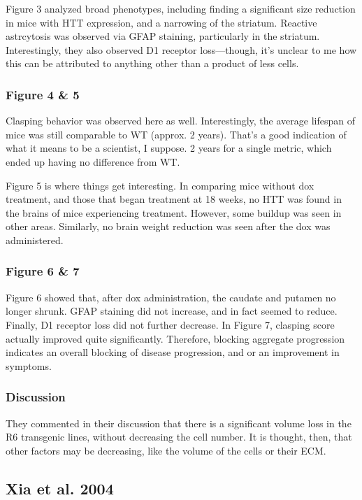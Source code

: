 Figure 3 analyzed broad phenotypes, including finding a significant size reduction in mice with HTT expression, and a narrowing of the striatum. Reactive astrcytosis was observed via GFAP staining, particularly in the striatum. Interestingly, they also observed D1 receptor loss---though, it's unclear to me how this can be attributed to anything other than a product of less cells. 

\subsubsection*{Figure 4 \& 5}

Clasping behavior was observed here as well. Interestingly, the average lifespan of mice was still comparable to WT (approx. 2 years). That's a good indication of what it means to be a scientist, I suppose. 2 years for a single metric, which ended up having no difference from WT.\newline

Figure 5 is where things get interesting. In comparing mice without dox treatment, and those that began treatment at 18 weeks, no HTT was found in the brains of mice experiencing treatment. However, some buildup was seen in other areas. Similarly, no brain weight reduction was seen after the dox was administered. 

\subsubsection*{Figure 6 \& 7}

Figure 6 showed that, after dox administration, the caudate and putamen no longer shrunk. GFAP staining did not increase, and in fact seemed to reduce. Finally, D1 receptor loss did not further decrease. In Figure 7, clasping score actually improved quite significantly. Therefore, blocking aggregate progression indicates an overall blocking of disease progression, and or an improvement in symptoms. 

\subsubsection*{Discussion}
They commented in their discussion that there is a significant volume loss in the R6 transgenic lines, without decreasing the cell number. It is thought, then, that other factors may be decreasing, like the volume of the cells or their ECM. 

\subsection*{Xia et al. 2004}

